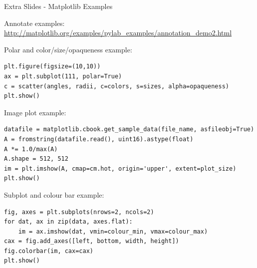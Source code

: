 \documentclass{beamer}
\begin{document}
\begin{frame}[fragile]{Extra Slides - Matplotlib Examples}
  \fontsize{6pt}{6}\selectfont
  \begin{block}{Annotate examples:}
      \url{http://matplotlib.org/examples/pylab_examples/annotation_demo2.html}
  \end{block}
  \begin{block}{Polar and color/size/opaqueness example:}
  \begin{lstlisting}
plt.figure(figsize=(10,10))
ax = plt.subplot(111, polar=True)
c = scatter(angles, radii, c=colors, s=sizes, alpha=opaqueness)
plt.show()
  \end{lstlisting}
  \end{block}
  \begin{block}{Image plot example:}
  \begin{lstlisting}
datafile = matplotlib.cbook.get_sample_data(file_name, asfileobj=True)
A = fromstring(datafile.read(), uint16).astype(float)
A *= 1.0/max(A)
A.shape = 512, 512
im = plt.imshow(A, cmap=cm.hot, origin='upper', extent=plot_size)
plt.show()
  \end{lstlisting}
  \end{block}
  \begin{block}{Subplot and colour bar example:}
  \begin{lstlisting}
fig, axes = plt.subplots(nrows=2, ncols=2)
for dat, ax in zip(data, axes.flat):
    im = ax.imshow(dat, vmin=colour_min, vmax=colour_max)
cax = fig.add_axes([left, bottom, width, height])
fig.colorbar(im, cax=cax)
plt.show()
  \end{lstlisting}
  \end{block}
\end{frame}
\end{document}

